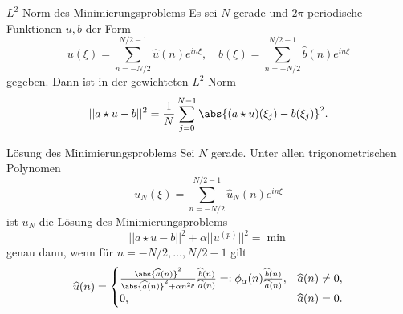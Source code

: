 \begin{karte}{\(L^2\)-Norm des Minimierungsproblems}
    Es sei \(N\) gerade und \(2\pi\)-periodische Funktionen \(u,b\) der Form 
    \[ u(\xi) = \sum_{n=-N/2}^{N/2-1} \widehat{u}(n) e^{in\xi}, 
    \quad b(\xi) = \sum_{n=-N/2}^{N/2-1} \widehat{b}(n) e^{in\xi} \]
    gegeben. Dann ist in der gewichteten \(L^2\)-Norm 
    \[ || a \star u - b||^2 = \frac{1}{N} \sum_{j=0}^{N-1} \abs{(a \star u)(\xi_j) - b(\xi_j)}^2. \]
\end{karte}

\begin{karte}{Lösung des Minimierungsproblems}
    Sei \(N\) gerade. Unter allen trigonometrischen Polynomen 
    \[ u_N(\xi) = \sum_{n=-N/2}^{N/2-1} \widehat{u}_N(n) e^{in\xi} \]
    ist \(u_N\) die Lösung des Minimierungsproblems 
    \[ ||a \star u - b||^2 + \alpha ||u^{(p)}||^2 = \min \] 
    genau dann, wenn für \(n=-N/2, \ldots, N/2-1\) gilt 
    \[ \widehat{u}(n) = \begin{cases}
        \frac{\abs{\widehat{a}(n)}^2}{\abs{\widehat{a}(n)}^2 + \alpha n^{2p}} \frac{\widehat{b}(n)}{\widehat{a}(n)} 
        =: \phi_\alpha(n) \frac{\widehat{b}(n)}{\widehat{a}(n)}, &\widehat{a}(n) \neq 0, \\
        0, & \widehat{a}(n) = 0.
    \end{cases} \]
\end{karte}